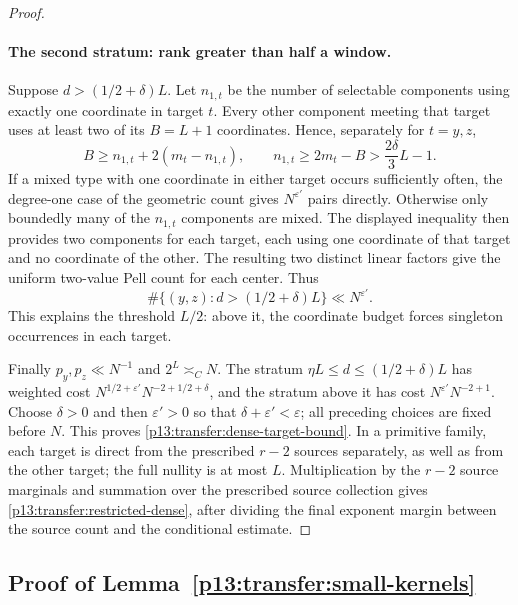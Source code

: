 \begin{proof}
\paragraph{The second stratum: rank greater than half a window.}
Suppose $d>(1/2+\delta)L$. Let $n_{1,t}$ be the number of selectable
components using exactly one coordinate in target $t$. Every other
component meeting that target uses at least two of its $B=L+1$
coordinates. Hence, separately for $t=y,z$,
\[
 B\geq n_{1,t}+2(m_t-n_{1,t}),\qquad
 n_{1,t}\geq2m_t-B>\frac{2\delta}{3}L-1.
\]
If a mixed type with one coordinate in either target occurs sufficiently
often, the degree-one case of the geometric count gives
$N^{\varepsilon'}$ pairs directly. Otherwise only boundedly many of
the $n_{1,t}$ components are mixed. The displayed inequality then
provides two components for each target, each using one coordinate of
that target and no coordinate of the other. The resulting two distinct
linear factors give the uniform two-value Pell count for each center.
Thus
\[
 \#\{(y,z):d>(1/2+\delta)L\}\ll N^{\varepsilon'}.
\]
This explains the threshold $L/2$: above it, the coordinate budget
forces singleton occurrences in each target.

Finally $p_y,p_z\ll N^{-1}$ and $2^L\asymp_C N$.
The stratum $\eta L\leq d\leq(1/2+\delta)L$ has weighted cost
$N^{1/2+\varepsilon'}N^{-2+1/2+\delta}$, and the stratum above it
has cost $N^{\varepsilon'}N^{-2+1}$. Choose $\delta>0$ and then
$\varepsilon'>0$ so that $\delta+\varepsilon'<\varepsilon$;
all preceding choices are fixed before $N$. This proves
\eqref{p13:transfer:dense-target-bound}.
In a primitive family, each target is direct from the prescribed
$r-2$ sources separately, as well as from the other target; the full
nullity is at most $L$. Multiplication by the $r-2$ source marginals
and summation over the prescribed source collection gives
\eqref{p13:transfer:restricted-dense}, after dividing the final exponent
margin between the source count and the conditional estimate.
\end{proof}

\subsection{Proof of Lemma~\ref{p13:transfer:small-kernels}}
\label{p14:comp:transfer-small-kernels}

